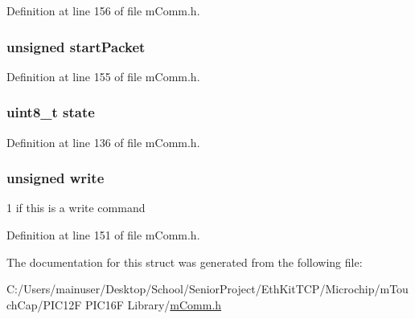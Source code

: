 Definition at line 156 of file m\+Comm.\+h.

\hypertarget{structm_comm___input_buffer_a54eec99f0e68e78d3ed4b064a5960cb5}{}
\subsubsection[{start\+Packet}]{\setlength{\rightskip}{0pt plus 5cm}unsigned start\+Packet}\label{structm_comm___input_buffer_a54eec99f0e68e78d3ed4b064a5960cb5}


Definition at line 155 of file m\+Comm.\+h.

\hypertarget{structm_comm___input_buffer_a0b57aa10271a66f3dc936bba1d2f3830}{}
\subsubsection[{state}]{\setlength{\rightskip}{0pt plus 5cm}uint8\+\_\+t state}\label{structm_comm___input_buffer_a0b57aa10271a66f3dc936bba1d2f3830}


Definition at line 136 of file m\+Comm.\+h.

\hypertarget{structm_comm___input_buffer_a7f9bd405bd2f03dec58905c3ec5f2964}{}
\subsubsection[{write}]{\setlength{\rightskip}{0pt plus 5cm}unsigned write}\label{structm_comm___input_buffer_a7f9bd405bd2f03dec58905c3ec5f2964}


\textquotesingle{}1\textquotesingle{} if this is a write command 



Definition at line 151 of file m\+Comm.\+h.



The documentation for this struct was generated from the following file\+:\begin{DoxyCompactItemize}
\item 
C\+:/\+Users/mainuser/\+Desktop/\+School/\+Senior\+Project/\+Eth\+Kit\+T\+C\+P/\+Microchip/m\+Touch\+Cap/\+P\+I\+C12\+F P\+I\+C16\+F Library/\hyperlink{m_comm_8h}{m\+Comm.\+h}\end{DoxyCompactItemize}
